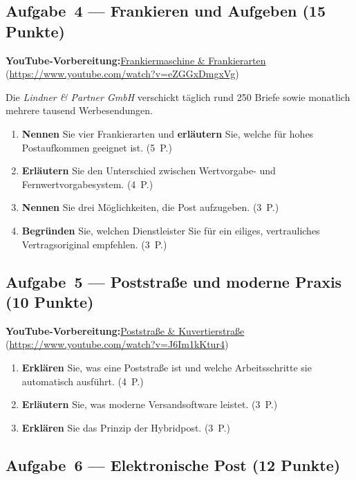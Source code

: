 \documentclass[11pt, a4paper]{article}
\begin{document}
\subsection*{Aufgabe~4 --- Frankieren und Aufgeben (15 Punkte)}

\noindent\textbf{\color{bfwAccent}YouTube-Vorbereitung:}\enspace \href{https://www.youtube.com/watch?v=eZGGxDmgxVg}{Frankiermaschine \& Frankierarten} (\url{https://www.youtube.com/watch?v=eZGGxDmgxVg})

\medskip
Die \emph{Lindner \& Partner GmbH} verschickt täglich rund 250 Briefe sowie monatlich
mehrere tausend Werbesendungen.

\begin{enumerate}[label=(\alph*)]
  \item \textbf{Nennen} Sie vier Frankierarten und \textbf{erläutern} Sie, welche für hohes Postaufkommen geeignet ist. \hfill (5~P.)
  \item \textbf{Erläutern} Sie den Unterschied zwischen Wertvorgabe- und Fernwertvorgabesystem. \hfill (4~P.)
  \item \textbf{Nennen} Sie drei Möglichkeiten, die Post aufzugeben. \hfill (3~P.)
  \item \textbf{Begründen} Sie, welchen Dienstleister Sie für ein eiliges, vertrauliches Vertragsoriginal empfehlen. \hfill (3~P.)
\end{enumerate}

\subsection*{Aufgabe~5 --- Poststraße und moderne Praxis (10 Punkte)}

\noindent\textbf{\color{bfwAccent}YouTube-Vorbereitung:}\enspace \href{https://www.youtube.com/watch?v=J6Im1kKtur4}{Poststraße \& Kuvertierstraße} (\url{https://www.youtube.com/watch?v=J6Im1kKtur4})

\medskip
\begin{enumerate}[label=(\alph*)]
  \item \textbf{Erklären} Sie, was eine Poststraße ist und welche Arbeitsschritte sie automatisch ausführt. \hfill (4~P.)
  \item \textbf{Erläutern} Sie, was moderne Versandsoftware leistet. \hfill (3~P.)
  \item \textbf{Erklären} Sie das Prinzip der Hybridpost. \hfill (3~P.)
\end{enumerate}

\subsection*{Aufgabe~6 --- Elektronische Post (12 Punkte)}
\end{document}
